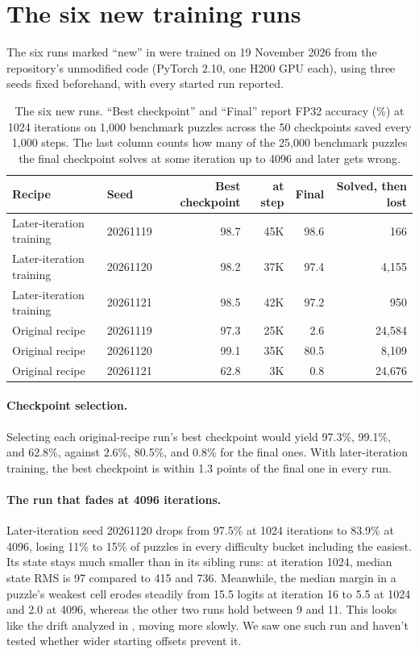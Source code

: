 \section{The six new training runs}
\label{app:cohort}

The six runs marked ``new'' in  were trained on 19 November 2026 from the repository's unmodified code (PyTorch 2.10, one H200 GPU each), using three seeds fixed beforehand, with every started run reported.

\begin{table}[h]
\centering
\small
\caption{The six new runs. ``Best checkpoint'' and ``Final'' report FP32 accuracy (\%) at 1024 iterations on 1,000 benchmark puzzles across the 50 checkpoints saved every 1,000 steps. The last column counts how many of the 25,000 benchmark puzzles the final checkpoint solves at some iteration up to 4096 and later gets wrong.}
\label{tab:cohort}
\begin{tabular}{@{}llrrrr@{}}
\toprule
Recipe & Seed & Best checkpoint & at step & Final & Solved, then lost \\
\midrule
Later-iteration training & 20261119 & 98.7 & 45K & 98.6 & 166 \\
Later-iteration training & 20261120 & 98.2 & 37K & 97.4 & 4,155 \\
Later-iteration training & 20261121 & 98.5 & 42K & 97.2 & 950 \\
\midrule
Original recipe & 20261119 & 97.3 & 25K & 2.6 & 24,584 \\
Original recipe & 20261120 & 99.1 & 35K & 80.5 & 8,109 \\
Original recipe & 20261121 & 62.8 & 3K & 0.8 & 24,676 \\
\bottomrule
\end{tabular}
\end{table}

\paragraph{Checkpoint selection.} Selecting each original-recipe run's best checkpoint would yield 97.3\%, 99.1\%, and 62.8\%, against 2.6\%, 80.5\%, and 0.8\% for the final ones. With later-iteration training, the best checkpoint is within 1.3 points of the final one in every run.

\paragraph{The run that fades at 4096 iterations.} Later-iteration seed 20261120 drops from 97.5\% at 1024 iterations to 83.9\% at 4096, losing 11\% to 15\% of puzzles in every difficulty bucket including the easiest. Its state stays much smaller than in its sibling runs: at iteration 1024, median state RMS is 97 compared to 415 and 736. Meanwhile, the median margin in a puzzle's weakest cell erodes steadily from 15.5 logits at iteration 16 to 5.5 at 1024 and 2.0 at 4096, whereas the other two runs hold between 9 and 11. This looks like the drift analyzed in , moving more slowly. We saw one such run and haven't tested whether wider starting offsets prevent it.


